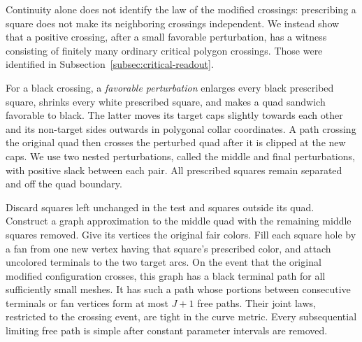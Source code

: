 Continuity alone does not identify the law of the modified crossings: prescribing
a square does not make its neighboring crossings independent. We instead
show that a positive crossing, after a small favorable perturbation, has a
witness consisting of finitely many ordinary critical polygon crossings.
Those were identified in Subsection~\ref{subsec:critical-readout}.

For a black crossing, a \emph{favorable perturbation} enlarges every black
prescribed square, shrinks every white prescribed square, and makes a quad
sandwich favorable to black. The latter moves its target caps slightly towards
each other and its non-target sides outwards in polygonal collar coordinates.
A path crossing the original quad then crosses the perturbed quad after it
is clipped at the new caps. We use two nested perturbations, called the
middle and final perturbations, with positive slack between each pair.
All prescribed squares remain separated and off the quad boundary.

\begin{lemma}
\label{lem:free-segments}
Discard squares left unchanged in the test and squares outside its quad.
Construct a graph approximation to the middle quad with the remaining
middle squares removed. Give its vertices the original fair colors. Fill each square hole
by a fan from one new vertex having that square's prescribed color, and
attach uncolored terminals to the two target arcs. On the event that the
original modified configuration crosses, this graph has a black terminal
path for all sufficiently small meshes. It has such a path whose portions
between consecutive terminals or fan vertices form at most $J+1$ free paths.
Their joint laws, restricted to the crossing event, are tight in the curve
metric. Every subsequential limiting free path is simple after constant
parameter intervals are removed.
\end{lemma}

